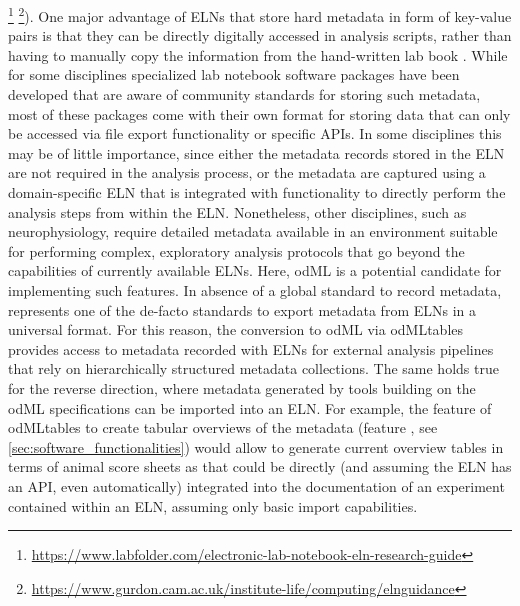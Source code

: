 \footnote{\url{https://www.labfolder.com/electronic-lab-notebook-eln-research-guide}} \footnote{\url{https://www.gurdon.cam.ac.uk/institute-life/computing/elnguidance}}). One major advantage of ELNs that store hard metadata \citep{Grewe_2011} in form of key-value pairs is that they can be directly digitally accessed in analysis scripts, rather than having to manually copy the information from the hand-written lab book \citep{Zehl_2016}. While for some disciplines specialized lab notebook software packages have been developed \citep{Kwok_2018} that are aware of community standards for storing such metadata, most of these packages come with their own format for storing data that can only be accessed via file export functionality or specific APIs. In some disciplines this may be of little importance, since either the metadata records stored in the ELN are not required in the analysis process, or the metadata are captured using a domain-specific ELN that is integrated with functionality to directly perform the analysis steps from within the ELN. Nonetheless, other disciplines, such as neurophysiology, require detailed metadata available in an environment suitable for performing complex, exploratory analysis protocols that go beyond the capabilities of currently available ELNs. Here, odML is a potential candidate for implementing such features. In absence of a global standard to record metadata,  represents one of the de-facto standards to export metadata from ELNs in a universal format. For this reason, the conversion to odML via odMLtables provides access to metadata recorded with ELNs for external analysis pipelines that rely on hierarchically structured metadata collections. The same holds true for the reverse direction, where metadata generated by tools building on the odML specifications can be imported into an ELN. For example, the feature of odMLtables to create tabular overviews of the metadata (feature \fcompare, see \cref{sec:software_functionalities}) would allow to generate current overview tables in terms of animal score sheets as  that could be directly (and assuming the ELN has an API, even automatically) integrated into the documentation of an experiment contained within an ELN, assuming only basic  import capabilities. 

